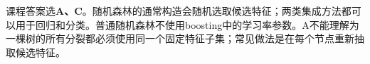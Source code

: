 课程答案选\textbf{A、C}。随机森林的通常构造会随机选取候选特征；两类集成方法都可以用于回归和分类。普通随机森林不使用boosting中的学习率参数。A不能理解为一棵树的所有分裂都必须使用同一个固定特征子集；常见做法是在每个节点重新抽取候选特征。
